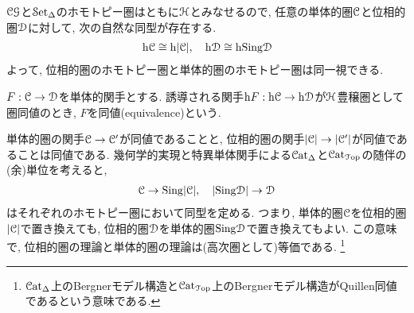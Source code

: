 \documentclass[uplatex, a4paper, 14Q, dvipdfmx]{jsreport}
\begin{document}
$\CGWH$と$\sSet$のホモトピー圏はともに$\H$とみなせるので, 任意の単体的圏$\C$と位相的圏$\D$に対して, 次の自然な同型が存在する. 
\begin{align*}
  \h\C \cong \h|\C|, ~~~ \h\D \cong \h\Sing\D
\end{align*}
よって, 位相的圏のホモトピー圏と単体的圏のホモトピー圏は同一視できる.


\begin{definition}[単体的圏の同値]
  $F : \C \to \D$を単体的関手とする. 
  誘導される関手$\h F : \h\C \to \h\D$が$\H$豊穣圏として圏同値のとき, $F$を同値(equivalence)という. 
\end{definition}

単体的圏の関手$\C \to \C'$が同値であることと, 位相的圏の関手$|\C| \to |\C'|$が同値であることは同値である. 
幾何学的実現と特異単体関手による$\Cat_\Delta$と$\CatTop$の随伴の(余)単位を考えると, 
\begin{align*}
  \C \to \Sing|\C|, ~~~ |\Sing\D| \to \D
\end{align*}
はそれぞれのホモトピー圏において同型を定める. 
つまり, 単体的圏$\C$を位相的圏$|\C|$で置き換えても, 位相的圏$\D$を単体的圏$\Sing\D$で置き換えてもよい. 
この意味で, 位相的圏の理論と単体的圏の理論は(高次圏として)等価である. 
\footnote{
  $\Cat_\Delta$上のBergnerモデル構造と$\CatTop$上のBergnerモデル構造がQuillen同値であるという意味である. 
}
\end{document}
